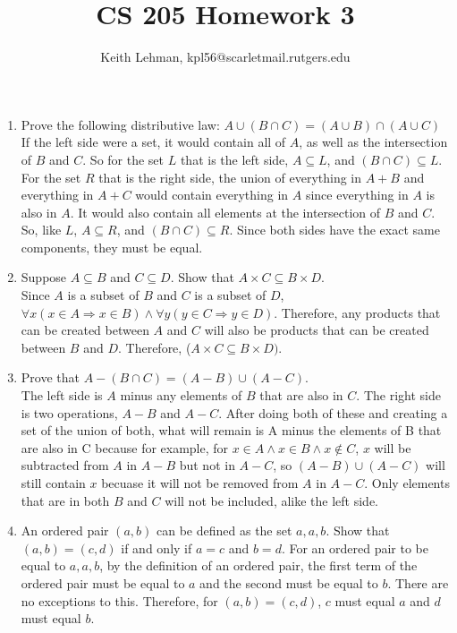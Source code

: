 \documentclass{article}
\title{CS 205 Homework 3}
\author{Keith Lehman, kpl56@scarletmail.rutgers.edu}
\begin{document}
\maketitle

\begin{enumerate}
\item Prove the following distributive law: $A \cup (B \cap  C) = (A \cup B) \cap (A \cup C)$ \\
    If the left side were a set, it would contain all of $A$, as well as the intersection of $B$ and $C$. So for the set $L$ that is the left side, $A \subseteq L$, and $(B \cap C) \subseteq L$. \\
    For the set $R$ that is the right side, the union of everything in $A + B$ and everything in $A + C$ would contain everything in $A$ since everything in $A$ is also in $A$. It would also contain all elements at the intersection of $B$ and $C$. So, like $L$, $A \subseteq R$, and $(B \cap C) \subseteq R$. Since both sides have the exact same components, they must be equal.
\item Suppose $A \subseteq B$ and $C \subseteq D$. Show that $A \times C \subseteq B \times D$. \\
    Since $A$ is a subset of $B$ and $C$ is a subset of $D$, $\forall x (x \in A \Longrightarrow x \in B) \land \forall y (y \in C \Longrightarrow y \in D)$. Therefore, any products that can be created between $A$ and $C$ will also be products that can be created between $B$ and $D$. Therefore, ($A \times C \subseteq B \times D)$.
\item Prove that $A - (B \cap C) = (A - B) \cup (A - C)$. \\
    The left side is $A$ minus any elements of $B$ that are also in $C$. The right side is two operations, $A - B$ and $A - C$. After doing both of these and creating a set of the union of both, what will remain is A minus the elements of B that are also in C because for example, for $x \in A \land x \in B \land x \notin C$, $x$ will be subtracted from $A$ in $A-B$ but not in $A-C$, so $(A-B) \cup (A-C)$ will still contain $x$ becuase it will not be removed from $A$ in $A-C$. Only elements that are in both $B$ and $C$ will not be included, alike the left side.
\item An ordered pair $(a, b)$ can be defined as the set ${a, {a,b}}$. Show that $(a,b) = (c,d)$ if and only if $a=c$ and $b=d$.
    For an ordered pair to be equal to ${a, {a,b}}$, by the definition of an ordered pair, the first term of the ordered pair must be equal to $a$ and the second must be equal to $b$. There are no exceptions to this. Therefore, for $(a,b)=(c,d)$, $c$ must equal $a$ and $d$ must equal $b$. 

\end{enumerate}
\end{document}
